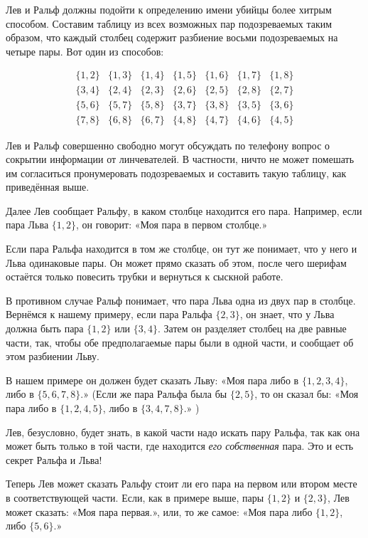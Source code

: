 Лев и Ральф должны подойти к определению имени убийцы более хитрым способом.
Составим таблицу из всех возможных пар подозреваемых таким образом, что каждый столбец содержит разбиение восьми подозреваемых на четыре пары.
Вот один из способов:

\[
\begin{matrix}
\{1,2\}&\{1,3\}&\{1,4\}&\{1,5\}&\{1,6\}&\{1,7\}&\{1,8\}
\\
\{3,4\}&\{2,4\}&\{2,3\}&\{2,6\}&\{2,5\}&\{2,8\}&\{2,7\}
\\
\{5,6\}&\{5,7\}&\{5,8\}&\{3,7\}&\{3,8\}&\{3,5\}&\{3,6\}
\\
\{7,8\}&\{6,8\}&\{6,7\}&\{4,8\}&\{4,7\}&\{4,6\}&\{4,5\}
\end{matrix}
\]


Лев и Ральф совершенно свободно могут обсуждать по телефону вопрос о сокрытии информации от линчевателей.
В частности, ничто не может помешать им согласиться пронумеровать подозреваемых и составить такую таблицу, как приведённая выше.

Далее Лев сообщает Ральфу, в каком столбце находится его пара.
Например, если пара Льва $\{1,2\}$, он говорит: «Моя пара в первом столбце.» 

Если пара Ральфа находится в том же столбце, он тут же понимает, что у него и Льва одинаковые пары.
Он может прямо сказать об этом, после чего шерифам остаётся только повесить трубки и вернуться к сыскной работе.

В противном случае Ральф понимает, что пара Льва одна из двух пар в столбце.
Вернёмся к нашему примеру, если пара Ральфа $\{2,3\}$, он знает, что у Льва должна быть пара $\{1,2\}$ или $\{3,4\}$.
Затем он разделяет столбец на две равные части, так, чтобы обе предполагаемые пары были в одной части, и сообщает об этом разбиении Льву.

В нашем примере он должен будет сказать Льву: «Моя пара либо в $\{1,2,3,4\}$, либо в $\{5,6,7,8\}$.» (Если же пара Ральфа была бы $\{2,5\}$, то он сказал бы: «Моя пара либо в $\{1,2,4,5\}$, либо в $\{3,4,7,8\}$.» )

Лев, безусловно, будет знать, в какой части надо искать пару Ральфа, так как она может быть только в той части, где находится \emph{его собственная} пара.
Это и есть секрет Ральфа и Льва!

Теперь Лев может сказать Ральфу стоит ли его пара на первом или втором месте в соответствующей части.
Если, как в примере выше, пары $\{1,2\}$ и $\{2,3\}$, Лев может сказать: «Моя пара первая.», или, то же самое: «Моя пара либо $\{1,2\}$, либо $\{5,6\}$.»


